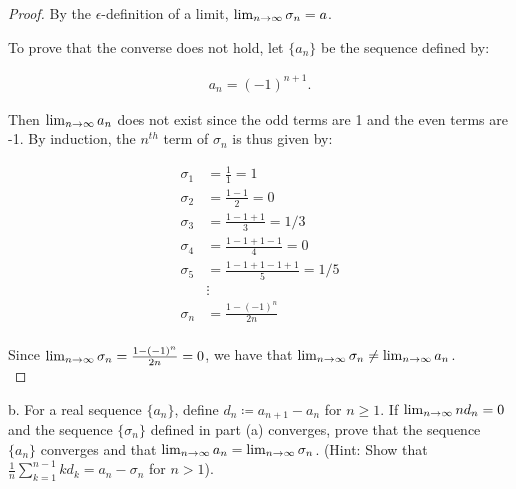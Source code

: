 \begin{proof}
        By the $\epsilon$-definition of a limit,
        ${\lim_{n \rightarrow \infty}{\sigma_n}} = a$.
        \pagebreak

        To prove that the converse does not hold, let $\{a_n\}$ be the
        sequence defined by:

        \begin{align*}
            a_n = (-1)^{n+1}.
        \end{align*}
        
        Then ${\lim_{n \rightarrow \infty}{a_n}}$ does not exist since the odd
        terms are 1 and the even terms are -1. By induction, the $n^{th}$ term of
        $\sigma_n$ is thus given by:

        \begin{align*}
            \sigma_1 &= \frac{1}{1} = 1 \\
            \sigma_2 &= \frac{1 - 1}{2} = 0 \\
            \sigma_3 &= \frac{1 - 1 + 1}{3} = 1/3 \\
            \sigma_4 &= \frac{1 - 1 + 1 - 1}{4} = 0 \\
            \sigma_5 &= \frac{1 - 1 + 1 - 1 + 1}{5} = 1/5 \\
                     &\vdots \\
            \sigma_n &= \frac{1 - (-1)^n}{2n} \\
        \end{align*}

        Since ${\lim_{n \rightarrow \infty}{\sigma_n = \frac{1 - (-1)^n}{2n}}} = 0$,
        we have that
        ${\lim_{n \rightarrow \infty}{\sigma_n}} \neq {\lim_{n \rightarrow \infty}{a_n}}$.
        \\
    \end{proof}
    \pagebreak

b.  For a real sequence $\{a_n\}$, define $d_n \coloneqq a_{n+1} - a_n$ for
    $n \ge 1$. If ${\lim_{n \rightarrow \infty}{nd_n}} = 0$ and the sequence
    $\{\sigma_n\}$ defined in part (a) converges, prove that the sequence
    $\{a_n\}$ converges and that
    ${\lim_{n \rightarrow \infty}{a_n}} = {\lim_{n \rightarrow \infty}{\sigma_n}}$.
    (Hint: Show that $\frac{1}{n}\sum\limits_{k=1}^{n-1}{kd_k} = a_n - \sigma_n$
     for $n > 1$).

